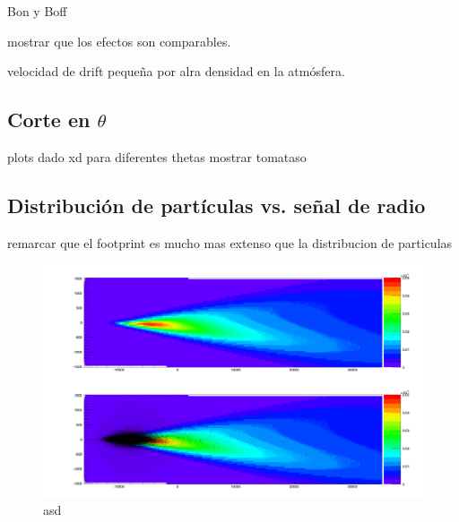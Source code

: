 	Bon y Boff
	
	mostrar que los efectos son comparables.
	
	velocidad de drift peque\~na por alra densidad en la atmósfera.
	
	
% 		
% 	
% 	
% 	
% 	
% 		
	
	\subsection{Corte en $\theta$}
	
	plots dado xd para diferentes thetas
	mostrar tomataso
	
	\clearpage
	\clearpage
	\subsection{Distribuci\'on de part\'iculas vs. se\~nal de radio}
	
	remarcar que el footprint es mucho mas extenso que la distribucion de particulas
	
	\begin{figure}[ht!]
		\centering
		\includegraphics[width=\textwidth]{./fig/simulacionRadio/ZHSEvent_1238_denseArray_E_Particulas}
		\caption{\label{fig:sim_foot_y_part}
		asd
		}
	\end{figure}
	
